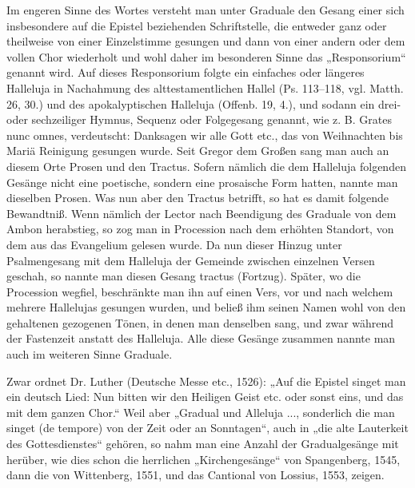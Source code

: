 Im engeren Sinne des Wortes versteht man unter Graduale den Gesang einer sich insbesondere auf die Epistel beziehenden Schriftstelle, die entweder ganz oder theilweise von einer Einzelstimme gesungen und dann von einer andern oder dem vollen Chor wiederholt und wohl daher im besonderen Sinne das „Responsorium“ genannt wird. Auf dieses Responsorium folgte ein einfaches oder längeres Halleluja in Nachahmung des alttestamentlichen Hallel (Ps. 113–118, vgl. Matth. 26, 30.) und des apokalyptischen Halleluja
(Offenb. 19, 4.), und sodann ein drei- oder sechzeiliger Hymnus, Sequenz oder Folgegesang genannt, wie z. B. Grates nunc omnes, verdeutscht: Danksagen wir alle Gott etc., das von Weihnachten bis Mariä Reinigung gesungen wurde. Seit Gregor dem Großen sang man auch an diesem Orte Prosen und den Tractus. Sofern nämlich die dem Halleluja folgenden Gesänge nicht eine poetische, sondern eine prosaische Form hatten, nannte man dieselben Prosen. Was nun aber den Tractus betrifft, so hat es damit folgende Bewandtniß. Wenn nämlich der Lector nach Beendigung des Graduale von dem Ambon herabstieg, so zog man in Procession nach dem erhöhten Standort, von dem aus das Evangelium gelesen wurde. Da nun dieser Hinzug unter Psalmengesang mit dem Halleluja der Gemeinde zwischen einzelnen Versen geschah, so nannte man diesen Gesang tractus (Fortzug). Später, wo die Procession wegfiel, beschränkte man ihn auf einen Vers, vor und nach welchem mehrere Hallelujas gesungen wurden, und beließ ihm seinen Namen wohl von den gehaltenen gezogenen Tönen, in denen man denselben sang, und zwar während der Fastenzeit anstatt des Halleluja. Alle diese Gesänge zusammen nannte man auch im weiteren Sinne Graduale.

Zwar ordnet Dr. Luther (Deutsche Messe etc., 1526): „Auf die Epistel singet man ein deutsch Lied: Nun bitten wir den Heiligen Geist etc. oder sonst eins, und das mit dem ganzen Chor.“ Weil aber „Gradual und Alleluja ..., sonderlich die man singet (de tempore) von der Zeit oder an Sonntagen“, auch in „die alte Lauterkeit des Gottesdienstes“ gehören, so nahm man eine Anzahl der Gradualgesänge mit herüber, wie dies schon die herrlichen „Kirchengesänge“ von Spangenberg, 1545, dann die von Wittenberg, 1551, und das Cantional von Lossius, 1553, zeigen.

